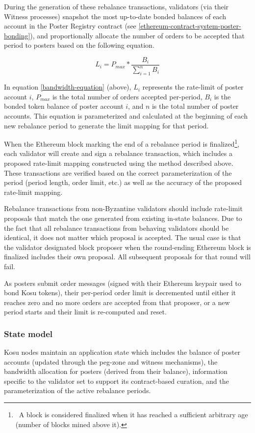 \documentclass[10pt]{article}
\begin{document}
During the generation of these rebalance transactions, validators (via their Witness processes) snapshot the most up-to-date bonded balances of each account in the Poster Registry contract (see \ref{ethereum-contract-system-poster-bonding}), and proportionally allocate the number of orders to be accepted that period to posters based on the following equation.

\begin{equation}\label{bandwidth-equation}
  L_i =  P_{max} * \frac{B_i}{\sum_{i=1}^{n}B_i}
\end{equation}
\medskip

In equation \ref{bandwidth-equation} (above), $L_i$ represents the rate-limit of poster account $i$, $P_{max}$ is the total number of orders accepted per-period, $B_i$ is the bonded token balance of poster account $i$, and $n$ is the total number of poster accounts. This equation is parameterized and calculated at the beginning of each new rebalance period to generate the limit mapping for that period.
\medskip 

When the Ethereum block marking the end of a rebalance period is finalized\footnote{\ A block is considered finalized when it has reached a sufficient arbitrary age (number of blocks mined above it).}, each validator will create and sign a rebalance transaction, which includes a proposed rate-limit mapping constructed using the method described above. These transactions are verified based on the correct parameterization of the period (period length, order limit, etc.) as well as the accuracy of the proposed rate-limit mapping. 
\medskip

Rebalance transactions from non-Byzantine validators should include rate-limit proposals that match the one generated from existing in-state balances. Due to the fact that all rebalance transactions from behaving validators should be identical, it does not matter which proposal is accepted. The usual case is that the validator designated block proposer when the round-ending Ethereum block is finalized includes their own proposal. All subsequent proposals for that round will fail.
\medskip

As posters submit order messages (signed with their Ethereum keypair used to bond Kosu tokens), their per-period order limit is decremented until either it reaches zero and no more orders are accepted from that proposer, or a new period starts and their limit is re-computed and reset.
\subsubsection{State model}\label{tm-network-state}
Kosu nodes maintain an application state which includes the balance of poster accounts (updated through the peg-zone and witness mechanisms), the bandwidth allocation for posters (derived from their balance), information specific to the validator set to support its contract-based curation, and the parameterization of the active rebalance periods.
\medskip
\end{document}
